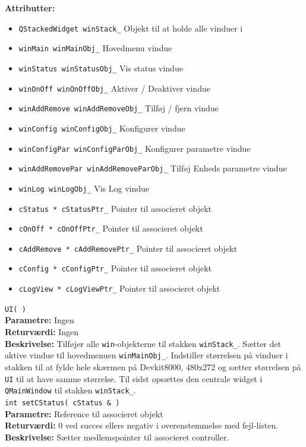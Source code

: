 \textbf{Attributter:}
\begin{itemize}
	\item \verb+QStackedWidget winStack_+ Objekt til at holde alle vinduer i
	\item \verb+winMain winMainObj_+ Hovedmenu vindue
	\item \verb+winStatus winStatusObj_+ Vis status vindue
	\item \verb+winOnOff winOnOffObj_+ Aktiver / Deaktiver vindue
	\item \verb+winAddRemove winAddRemoveObj_+ Tilføj / fjern vindue
	\item \verb+winConfig winConfigObj_+ Konfigurer vindue
	\item \verb+winConfigPar winConfigParObj_+ Konfigurer parametre vindue
	\item \verb+winAddRemovePar winAddRemoveParObj_+ Tilføj Enheds parametre vindue
	\item \verb+winLog winLogObj_+ Vis Log vindue
	\item \verb+cStatus * cStatusPtr_+ Pointer til associeret objekt
	\item \verb+cOnOff * cOnOffPtr_+ Pointer til associeret objekt
	\item \verb+cAddRemove * cAddRemovePtr_+ Pointer til associeret objekt
	\item \verb+cConfig * cConfigPtr_+ Pointer til associeret objekt
	\item \verb+cLogView * cLogViewPtr_+ Pointer til associeret objekt
\end{itemize}

\verb+UI( )+\\
\textbf{Parametre:} Ingen \\
\textbf{Returværdi:} Ingen \\
\textbf{Beskrivelse:} Tilføjer alle \verb+win+-objekterne til stakken \verb+winStack_+. Sætter det aktive vindue til hovedmenuen \verb+winMainObj_+. Indstiller størrelsen på vinduer i stakken til at fylde hele skærmen på Devkit8000, 480x272 og sætter størrelsen på \verb+UI+ til at have samme størrelse. Til sidst opsættes den centrale widget i \verb+QMainWindow+ til stakken \verb+winStack_+.\\

\verb+int setCStatus( cStatus & )+\\
\textbf{Parametre:} Reference til associeret objekt \\
\textbf{Returværdi:} 0 ved succes ellers negativ i overenstemmelse med fejl-listen. \\
\textbf{Beskrivelse:} Sætter medlemspointer til associeret controller.\\

